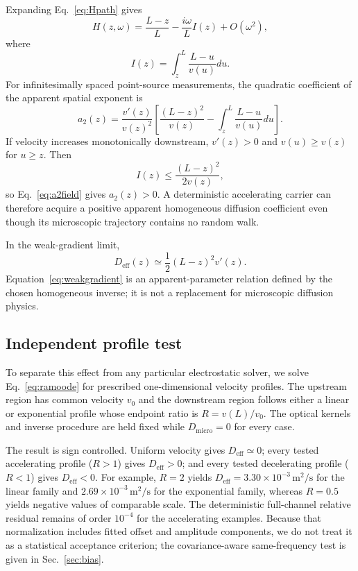 \documentclass[aps,pra,twocolumn,superscriptaddress,nofootinbib]{revtex4-2}
\newcommand{\Deff}{D_{\mathrm{eff}}}
\newcommand{\Dmicro}{D_{\mathrm{micro}}}
\begin{document}
Expanding Eq.~\eqref{eq:Hpath} gives
\begin{equation}
H(z,\omega)=\frac{L-z}{L}
-\frac{i\omega}{L}I(z)+O(\omega^2),
\end{equation}
where
\begin{equation}
I(z)=\int_z^L\frac{L-u}{v(u)}du.
\end{equation}
For infinitesimally spaced point-source measurements, the quadratic coefficient of the apparent spatial exponent is
\begin{equation}
\boxed{
a_2(z)=
\frac{v'(z)}{v(z)^2}
\left[
\frac{(L-z)^2}{v(z)}-
\int_z^L\frac{L-u}{v(u)}du
\right].
}
\label{eq:a2field}
\end{equation}
If velocity increases monotonically downstream, $v'(z)>0$ and $v(u)\ge v(z)$ for $u\ge z$. Then
\begin{equation}
I(z)\le\frac{(L-z)^2}{2v(z)},
\end{equation}
so Eq.~\eqref{eq:a2field} gives $a_2(z)>0$. A deterministic accelerating carrier can therefore acquire a positive apparent homogeneous diffusion coefficient even though its microscopic trajectory contains no random walk.

In the weak-gradient limit,
\begin{equation}
\boxed{
\Deff(z)\simeq\frac{1}{2}(L-z)^2v'(z).
}
\label{eq:weakgradient}
\end{equation}
Equation~\eqref{eq:weakgradient} is an apparent-parameter relation defined by the chosen homogeneous inverse; it is not a replacement for microscopic diffusion physics.

\subsection{Independent profile test}

To separate this effect from any particular electrostatic solver, we solve Eq.~\eqref{eq:ramoode} for prescribed one-dimensional velocity profiles. The upstream region has common velocity $v_0$ and the downstream region follows either a linear or exponential profile whose endpoint ratio is $R=v(L)/v_0$. The optical kernels and inverse procedure are held fixed while $\Dmicro=0$ for every case.

The result is sign controlled. Uniform velocity gives $\Deff\simeq0$; every tested accelerating profile ($R>1$) gives $\Deff>0$; and every tested decelerating profile ($R<1$) gives $\Deff<0$. For example, $R=2$ yields $\Deff=3.30\times10^{-3}\,\mathrm{m^2/s}$ for the linear family and $2.69\times10^{-3}\,\mathrm{m^2/s}$ for the exponential family, whereas $R=0.5$ yields negative values of comparable scale. The deterministic full-channel relative residual remains of order $10^{-4}$ for the accelerating examples.  Because that normalization includes fitted offset and amplitude components, we do not treat it as a statistical acceptance criterion; the covariance-aware same-frequency test is given in Sec.~\ref{sec:bias}.
\end{document}
